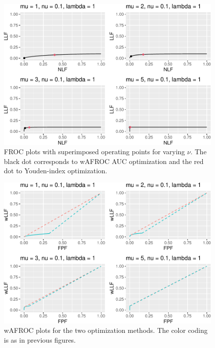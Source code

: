\documentclass[
]{book}
\begin{document}
\begin{figure}
\centering
\includegraphics{21-optim-op-point_files/figure-latex/optim-op-point-low-performance-vary-mu-vary-all-froc-1.pdf}
\caption{\label{fig:optim-op-point-low-performance-vary-mu-vary-all-froc}FROC plots with superimposed operating points for varying \(\nu\). The black dot corresponds to wAFROC AUC optimization and the red dot to Youden-index optimization.}
\end{figure}

\begin{figure}
\centering
\includegraphics{21-optim-op-point_files/figure-latex/optim-op-point-low-performance-vary-mu-vary-all-wafroc-1.pdf}
\caption{\label{fig:optim-op-point-low-performance-vary-mu-vary-all-wafroc}wAFROC plots for the two optimization methods. The color coding is as in previous figures.}
\end{figure}
\end{document}
